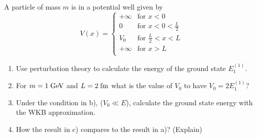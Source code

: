 \begin{esercizio}
   A particle of mass $m$ is in a potential well given by
   \begin{equation*}
      V(x)=
      \begin{cases}
         +\infty & \text{for } x<0\\
         0 & \text{for } x<0<\frac{L}{2}\\
         V_0 & \text{for } \frac{L}{2}<x<L\\
         +\infty & \text{for } x>L\\
      \end{cases}
   \end{equation*}
   \begin{enumerate}[label=\alph*), leftmargin=0.6cm]
      \item Use perturbation theory to calculate the energy of the ground state $E_1^{(1)}$.
      \item For $m=1 \; \rm GeV$ and $L=2 \; \rm fm$ what is the value of $V_0$ to have $V_0=2E_1^{(1)}$?
      \item Under the condition in b), ($V_0 \ll E$), calculate the ground state energy with the WKB approximation.
      \item How the result in c) compares to the result in a)? (Explain)
   \end{enumerate}
\end{esercizio}
